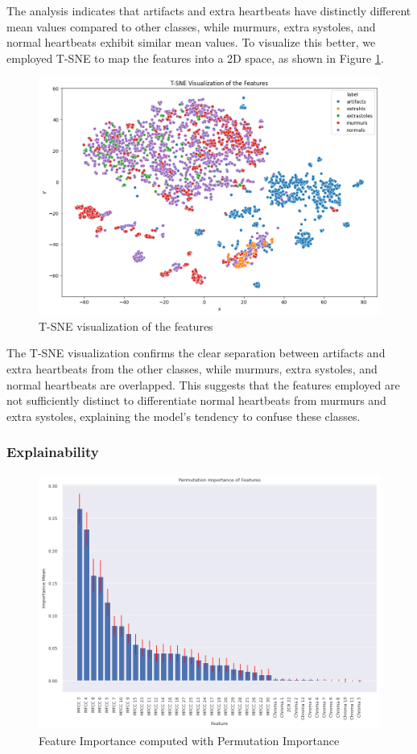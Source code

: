 \noindent
The analysis indicates that artifacts and extra heartbeats have distinctly different mean values compared to other classes, while murmurs, extra systoles, 
and normal heartbeats exhibit similar mean values. To visualize this better, we employed T-SNE to map the features into a 2D space, as shown in Figure \ref{fig:t_sne_visualization}.

\begin{figure}[H]
    \centering
    \includegraphics[width=.9\columnwidth]{../images/t-sne_feature_visualization.png}
    \caption{T-SNE visualization of the features}
    \label{fig:t_sne_visualization}
\end{figure}
\noindent
The T-SNE visualization confirms the clear separation between artifacts and extra heartbeats from the other classes, while murmurs, extra systoles,
 and normal heartbeats are overlapped. This suggests that the features employed are not sufficiently distinct to differentiate normal heartbeats 
 from murmurs and extra systoles, explaining the model's tendency to confuse these classes.


\subsubsection*{Explainability}

\begin{figure}[H]
    \centering
    \includegraphics[width=.8\columnwidth]{../images/permutation_feature_importance.png}
    \caption{Feature Importance computed with Permutation Importance}
    \label{fig:permutation_feature_importance}
\end{figure}


